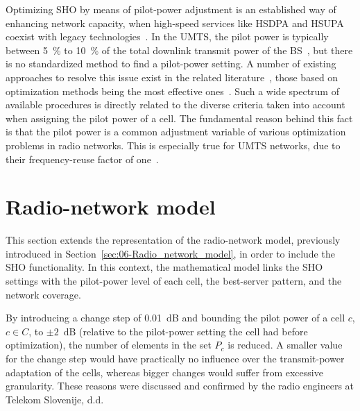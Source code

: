 Optimizing SHO by means of pilot-power adjustment is an established
way of enhancing network capacity, when high-speed services like HSDPA
and HSUPA coexist with legacy technologies~\cite{chen2008cpich}.
In the UMTS, the pilot power is typically between 5~\% to 10~\%
of the total downlink transmit power of the BS~\cite{RadioNetworkPlanningAndOptimisationForUMTS},
but there is no standardized method to fi{}nd a pilot-power setting.
A number of existing approaches to resolve this issue exist in the
related literature~\cite{WCDMAforUMTS_RadioAccessForThirdGenerationMobileCommunications,Siomina_PilotPowerManagementInWCDMANetworksCoverageControlWithRespectToTrafficDistribution,Ying_CPICHPowerSettingsInIrregularWCDMAMacroCellularNetworks},
those based on optimization methods being the most eff{}ective ones~\cite{Eisenblatter_OptimizationMethodsForUMTSRadioNetworkPlanning,GarciaLozano_CPICHPowerOptimisationByMeansOfSimulatedAnnealingInAnUTRAFDDEnvironment,RadioNetworkPlanningAndOptimisationForUMTS,UMTSRadioNetworkPlanning_OptimizationAndQoSManagementForPracticalEngineeringTasks,Siomina:Minimum.pilot.power.for.service.coverage}.
Such a wide spectrum of available procedures is directly related to
the diverse criteria taken into account when assigning the pilot power
of a cell. The fundamental reason behind this fact is that the pilot
power is a common adjustment variable of various optimization problems
in radio networks. This is especially true for UMTS networks, due
to their frequency-reuse factor of one~\cite{WCDMAforUMTS_RadioAccessForThirdGenerationMobileCommunications}.


\section{Radio-network model \label{sec:07-Radio_network_model}}

This section extends the representation of the radio-network model,
previously introduced in Section~\ref{sec:06-Radio_network_model},
in order to include the SHO functionality. In this context, the mathematical
model links the SHO settings with the pilot-power level of each cell,
the best-server pattern, and the network coverage.

By introducing a change step of 0.01~dB and bounding the pilot power
of a cell $c$, $c\in C$, to $\pm2$~dB (relative to the pilot-power
setting the cell had before optimization), the number of elements
in the set $P_{c}$ is reduced. A smaller value for the change step
would have practically no influence over the transmit-power adaptation
of the cells, whereas bigger changes would suffer from excessive granularity.
These reasons were discussed and confirmed by the radio engineers
at Telekom Slovenije, d.d.

